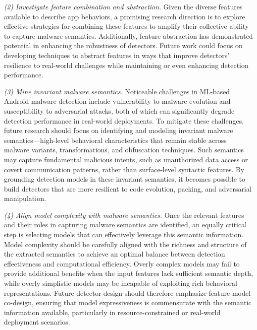 \noindent \textit{(2) Investigate feature combination and abstraction.}
Given the diverse features available to describe app behaviors, a promising research direction is to explore effective strategies for combining these features to amplify their collective ability to capture malware semantics. 
Additionally, feature abstraction has demonstrated potential in enhancing the robustness of detectors. 
Future work could focus on developing techniques to abstract features in ways that improve detectors' resilience to real-world challenges while maintaining or even enhancing detection performance.

\noindent \textit{(3) Mine invariant malware semantics.}
Noticeable challenges in ML-based Android malware detection include vulnerability to malware evolution and susceptibility to adversarial attacks, both of which can significantly degrade detection performance in real-world deployments.
To mitigate these challenges, future research should focus on identifying and modeling invariant malware semantics—high-level behavioral characteristics that remain stable across malware variants, transformations, and obfuscation techniques.
Such semantics may capture fundamental malicious intents, such as unauthorized data access or covert communication patterns, rather than surface-level syntactic features.
By grounding detection models in these invariant semantics, it becomes possible to build detectors that are more resilient to code evolution, packing, and adversarial manipulation. 



\noindent \textit{(4) Align model complexity with malware semantics.}
%
Once the relevant features and their roles in capturing malware semantics are identified, an equally critical step is selecting models that can effectively leverage this semantic information.
Model complexity should be carefully aligned with the richness and structure of the extracted semantics to achieve an optimal balance between detection effectiveness and computational efficiency.
Overly complex models may fail to provide additional benefits when the input features lack sufficient semantic depth, while overly simplistic models may be incapable of exploiting rich behavioral representations.
Future detector design should therefore emphasize feature-model co-design, ensuring that model expressiveness is commensurate with the semantic information available, particularly in resource-constrained or real-world deployment scenarios.

